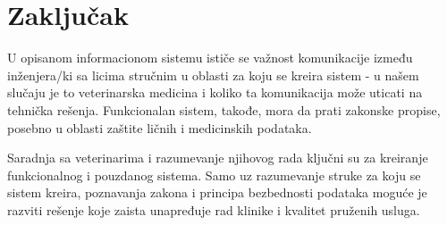 \section{Zaključak}

\indent U opisanom informacionom sistemu ističe se važnost komunikacije između inženjera/ki sa licima stručnim u oblasti za koju se kreira sistem - u našem slučaju je to veterinarska medicina i koliko ta komunikacija može uticati na tehnička rešenja. Funkcionalan sistem, takođe, mora da prati zakonske propise, posebno u oblasti zaštite ličnih i medicinskih podataka.

Saradnja sa veterinarima i razumevanje njihovog rada ključni su za kreiranje funkcionalnog i pouzdanog sistema. Samo uz razumevanje struke za koju se sistem kreira, poznavanja zakona i principa bezbednosti podataka moguće je razviti rešenje koje zaista unapređuje rad klinike i kvalitet pruženih usluga.
